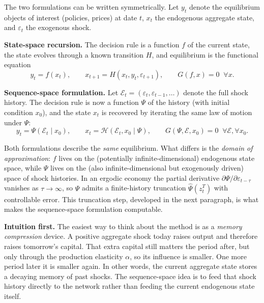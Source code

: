 \documentclass[11pt,a4paper]{report}
\begin{document}
\begin{definitionbox}
\small
The two formulations can be written symmetrically.  Let $y_t$ denote the equilibrium objects of interest (policies, prices) at date $t$, $x_t$ the endogenous aggregate state, and $\varepsilon_t$ the exogenous shock.

\medskip\noindent\textbf{State-space recursion.}  The decision rule is a function $f$ of the current state, the state evolves through a known transition $H$, and equilibrium is the functional equation
\[
y_t = f(x_t), \qquad x_{t+1} = H(x_t, y_t, \varepsilon_{t+1}), \qquad G(f, x) = 0 \;\;\forall x.
\]

\noindent\textbf{Sequence-space formulation.}  Let $\mathcal{E}_t = (\varepsilon_t, \varepsilon_{t-1}, \ldots)$ denote the full shock history.  The decision rule is now a function $\Psi$ of the history (with initial condition $x_0$), and the state $x_t$ is recovered by iterating the same law of motion under $\Psi$:
\[
y_t = \Psi(\mathcal{E}_t \mid x_0), \qquad x_t = \mathcal{H}(\mathcal{E}_t, x_0 \mid \Psi), \qquad G(\Psi, \mathcal{E}, x_0) = 0 \;\;\forall \mathcal{E}, \forall x_0.
\]

\noindent Both formulations describe the \emph{same} equilibrium.  What differs is the \emph{domain of approximation}: $f$ lives on the (potentially infinite-dimensional) endogenous state space, while $\Psi$ lives on the (also infinite-dimensional but exogenously driven) space of shock histories.  In an ergodic economy the partial derivative $\partial\Psi/\partial\varepsilon_{t-\tau}$ vanishes as $\tau\to\infty$, so $\Psi$ admits a finite-history truncation $\widehat\Psi(z_t^T)$ with controllable error.  This truncation step, developed in the next paragraph, is what makes the sequence-space formulation computable.
\end{definitionbox}

\medskip\noindent\textbf{Intuition first.}
The easiest way to think about the method is as a \emph{memory compression} device.  A positive aggregate shock today raises output and therefore raises tomorrow's capital.  That extra capital still matters the period after, but only through the production elasticity $\alpha$, so its influence is smaller.  One more period later it is smaller again.  In other words, the current aggregate state stores a decaying memory of past shocks.  The sequence-space idea is to feed that shock history directly to the network rather than feeding the current endogenous state itself.
\end{document}
